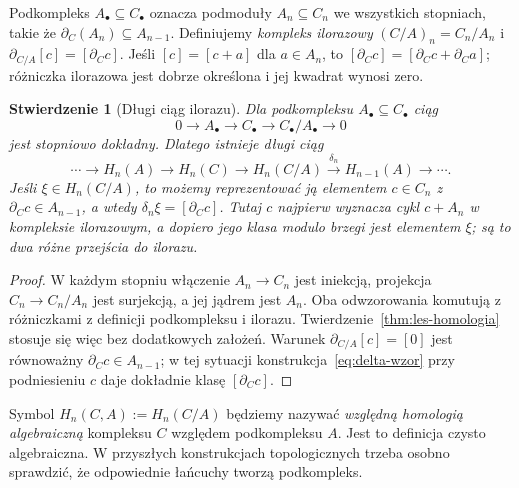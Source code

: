 \documentclass[11pt,a4paper,oneside]{report}
\theoremstyle{plain}
\newtheorem{stwierdzenie}[twierdzenie]{Stwierdzenie}
\theoremstyle{definition}
\theoremstyle{remark}
\begin{document}
Podkompleks $A_\bullet\subseteq C_\bullet$
oznacza podmoduły $A_n\subseteq C_n$
we wszystkich stopniach, takie że
$\partial_C(A_n)\subseteq A_{n-1}$.
Definiujemy \emph{kompleks ilorazowy}
$(C/A)_n=C_n/A_n$ i
$\partial_{C/A}[c]=[\partial_Cc]$.
Jeśli $[c]=[c+a]$ dla $a\in A_n$,
to $[\partial_Cc]=[\partial_Cc+\partial_Ca]$;
różniczka ilorazowa jest dobrze
określona i jej kwadrat wynosi zero.

\begin{stwierdzenie}[Długi ciąg ilorazu]
\label{prop:ses-iloraz}
Dla podkompleksu $A_\bullet\subseteq C_\bullet$
ciąg
\[
 0\longrightarrow A_\bullet
 \longrightarrow C_\bullet
 \longrightarrow C_\bullet/A_\bullet
 \longrightarrow0
\]
jest stopniowo dokładny. Dlatego istnieje
długi ciąg
\begin{equation}\label{eq:les-iloraz}
 \cdots\to H_n(A)\to H_n(C)\to H_n(C/A)
 \xrightarrow{\delta_n}H_{n-1}(A)\to\cdots.
\end{equation}
Jeśli $\xi\in H_n(C/A)$, to możemy
reprezentować ją elementem $c\in C_n$
z $\partial_Cc\in A_{n-1}$, a wtedy
$\delta_n\xi=[\partial_Cc]$. Tutaj $c$ najpierw wyznacza cykl
$c+A_n$ w kompleksie ilorazowym, a dopiero jego klasa modulo
brzegi jest elementem $\xi$; są to dwa różne przejścia do ilorazu.
\end{stwierdzenie}
\begin{proof}
W każdym stopniu włączenie $A_n\to C_n$
jest iniekcją, projekcja $C_n\to C_n/A_n$
jest surjekcją, a jej jądrem jest $A_n$.
Oba odwzorowania komutują z różniczkami
z definicji podkompleksu i ilorazu.
Twierdzenie~\ref{thm:les-homologia}
stosuje się więc bez dodatkowych
założeń. Warunek
$\partial_{C/A}[c]=[0]$ jest równoważny
$\partial_Cc\in A_{n-1}$; w tej sytuacji
konstrukcja~\eqref{eq:delta-wzor}
przy podniesieniu $c$ daje dokładnie
klasę $[\partial_Cc]$.
\end{proof}

Symbol $H_n(C,A):=H_n(C/A)$ będziemy
nazywać \emph{względną homologią
algebraiczną} kompleksu $C$ względem
podkompleksu $A$. Jest to definicja
czysto algebraiczna. W przyszłych
konstrukcjach topologicznych trzeba
osobno sprawdzić, że odpowiednie
łańcuchy tworzą podkompleks.
\end{document}
